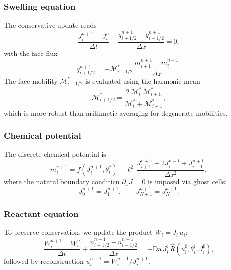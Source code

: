 \documentclass[aps,pre,reprint,superscriptaddress,longbibliography,floatfix]{revtex4-2}
\newcommand{\Ms}{\mathcal{M}}
\newcommand{\Da}{\mathrm{Da}}
\newcommand{\Rhat}{\widehat{R}}
\begin{document}
\subsubsection{Swelling equation}

The conservative update reads
\begin{equation}
  \frac{J_i^{n+1} - J_i^{n}}{\Delta t}
  + \frac{q_{i+1/2}^{n+1} - q_{i-1/2}^{n+1}}{\Delta x} = 0,
  \label{eq:disc_J}
\end{equation}
with the face flux
\begin{equation}
  q_{i+1/2}^{n+1}
  = -\Ms_{i+1/2}^{*}\,
  \frac{m_{i+1}^{n+1} - m_i^{n+1}}{\Delta x}.
  \label{eq:disc_q}
\end{equation}
The face mobility $\Ms_{i+1/2}^{*}$ is evaluated using the harmonic mean
\begin{equation}
  \Ms_{i+1/2}^{*}
  = \frac{2\,\Ms_i^{*}\,\Ms_{i+1}^{*}}{\Ms_i^{*} + \Ms_{i+1}^{*}},
  \label{eq:harm_mean}
\end{equation}
which is more robust than arithmetic averaging for degenerate mobilities.

\subsubsection{Chemical potential}

The discrete chemical potential is
\begin{equation}
  m_i^{n+1}
  = f(J_i^{n+1},\theta_i^{*})
  - \ell^2\,\frac{J_{i+1}^{n+1} - 2J_i^{n+1} + J_{i-1}^{n+1}}{\Delta x^2},
  \label{eq:disc_m}
\end{equation}
where the natural boundary condition $\partial_x J = 0$ is imposed via ghost cells:
\begin{equation}
  J_0^{n+1} = J_1^{n+1}, \qquad J_{N+1}^{n+1} = J_N^{n+1}.
  \label{eq:ghost_J}
\end{equation}

\subsubsection{Reactant equation}

To preserve conservation, we update the product $W_i = J_i\,u_i$:
\begin{equation}
  \frac{W_i^{n+1} - W_i^{n}}{\Delta t}
  + \frac{n_{i+1/2}^{n+1} - n_{i-1/2}^{n+1}}{\Delta x}
  = -\Da\,J_i^{\sharp}\,\Rhat(u_i^{\sharp},\theta_i^{\sharp},J_i^{\sharp}),
  \label{eq:disc_W}
\end{equation}
followed by reconstruction $u_i^{n+1} = W_i^{n+1}/J_i^{n+1}$.
\end{document}
